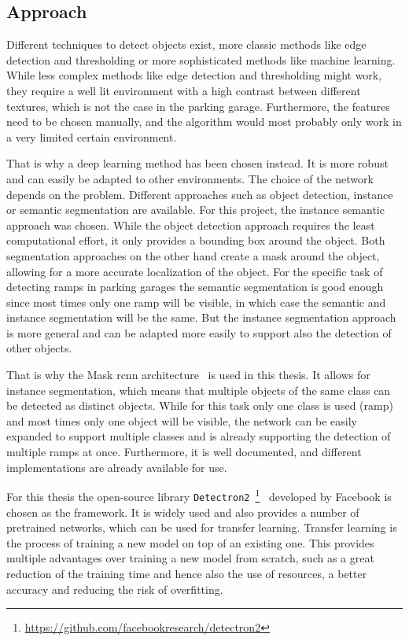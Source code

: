 \subsection{Approach}
Different techniques to detect objects exist, more classic methods like edge detection and thresholding or more sophisticated methods like machine learning.
While less complex methods like edge detection and thresholding might work, they require a well lit environment with a high contrast between different textures, which is not the case in the parking garage.
Furthermore, the features need to be chosen manually, and the algorithm would most probably only work in a very limited certain environment.

That is why a deep learning method has been chosen instead.
It is more robust and can easily be adapted to other environments.
The choice of the network depends on the problem.
Different approaches such as object detection, instance or semantic segmentation are available.
For this project, the instance semantic approach was chosen.
While the object detection approach requires the least computational effort, it only provides a bounding box around the object.
Both segmentation approaches on the other hand create a mask around the object, allowing for a more accurate localization of the object.
For the specific task of detecting ramps in parking garages the semantic segmentation is good enough since most times only one ramp will be visible, in which case the semantic and instance segmentation will be the same.
But the instance segmentation approach is more general and can be adapted more easily to support also the detection of other objects.

That is why the Mask \gls{rcnn} architecture~\cite{He2017} is used in this thesis.
It allows for instance segmentation, which means that multiple objects of the same class can be detected as distinct objects.
While for this task only one class is used (ramp) and most times only one object will be visible, the network can be easily expanded to support multiple classes and is already supporting the detection of multiple ramps at once.
Furthermore, it is well documented, and different implementations are already available for use.

For this thesis the open-source library \texttt{Detectron2}~\footnote{\url{https://github.com/facebookresearch/detectron2}}~\cite{Wu2019} developed by Facebook is chosen as the framework.
It is widely used and also provides a number of pretrained networks, which can be used for transfer learning.
Transfer learning is the process of training a new model on top of an existing one.
This provides multiple advantages over training a new model from scratch, such as a great reduction of the training time and hence also the use of resources, a better accuracy and reducing the risk of overfitting.

